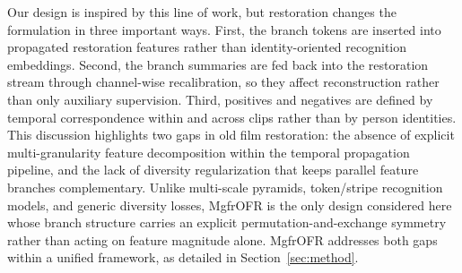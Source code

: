 Our design is inspired by this line of work, but restoration changes the formulation in three important ways. First, the branch tokens are inserted into propagated restoration features rather than identity-oriented recognition embeddings. Second, the branch summaries are fed back into the restoration stream through channel-wise recalibration, so they affect reconstruction rather than only auxiliary supervision. Third, positives and negatives are defined by temporal correspondence within and across clips rather than by person identities. This discussion highlights two gaps in old film restoration: the absence of explicit multi-granularity feature decomposition within the temporal propagation pipeline, and the lack of diversity regularization that keeps parallel feature branches complementary. Unlike multi-scale pyramids, token/stripe recognition models, and generic diversity losses, MgfrOFR is the only design considered here whose branch structure carries an explicit permutation-and-exchange symmetry rather than acting on feature magnitude alone. MgfrOFR addresses both gaps within a unified framework, as detailed in Section~\ref{sec:method}.
